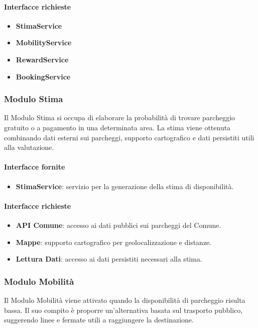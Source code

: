 \documentclass[12pt,a4paper]{article}
\begin{document}
\paragraph{Interfacce richieste}
\begin{itemize}
    \item \textbf{StimaService}
    \item \textbf{MobilityService}
    \item \textbf{RewardService}
    \item \textbf{BookingService}
\end{itemize}

\subsubsection{Modulo Stima}
Il Modulo Stima si occupa di elaborare la probabilità di trovare parcheggio gratuito o a pagamento in una determinata area. La stima viene ottenuta combinando dati esterni sui parcheggi, supporto cartografico e dati persistiti utili alla valutazione.

\paragraph{Interfacce fornite}
\begin{itemize}
    \item \textbf{StimaService}: servizio per la generazione della stima di disponibilità.
\end{itemize}

\paragraph{Interfacce richieste}
\begin{itemize}
    \item \textbf{API Comune}: accesso ai dati pubblici sui parcheggi del Comune.
    \item \textbf{Mappe}: supporto cartografico per geolocalizzazione e distanze.
    \item \textbf{Lettura Dati}: accesso ai dati persistiti necessari alla stima.
\end{itemize}

\subsubsection{Modulo Mobilità}
Il Modulo Mobilità viene attivato quando la disponibilità di parcheggio risulta bassa. Il suo compito è proporre un’alternativa basata sul trasporto pubblico, suggerendo linee e fermate utili a raggiungere la destinazione.
\end{document}
